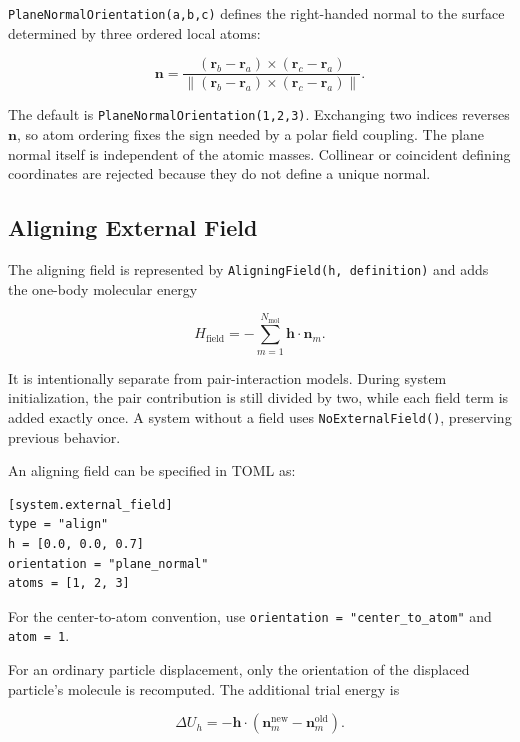 \documentclass[11pt]{article}
\begin{document}
\texttt{PlaneNormalOrientation(a,b,c)} defines the right-handed normal to the
surface determined by three ordered local atoms:

\begin{equation}
\mathbf n
=
\frac{(\mathbf r_b-\mathbf r_a)\times
      (\mathbf r_c-\mathbf r_a)}
     {\lVert(\mathbf r_b-\mathbf r_a)\times
      (\mathbf r_c-\mathbf r_a)\rVert}.
\end{equation}

The default is \texttt{PlaneNormalOrientation(1,2,3)}. Exchanging two indices
reverses \(\mathbf n\), so atom ordering fixes the sign needed by a polar field
coupling. The plane normal itself is independent of the atomic masses. Collinear
or coincident defining coordinates are rejected because they do not define a
unique normal.

\subsection{Aligning External Field}

The aligning field is represented by \texttt{AligningField(h, definition)} and
adds the one-body molecular energy

\begin{equation}
H_{\mathrm{field}}
=
-\sum_{m=1}^{N_{\mathrm{mol}}}\mathbf h\cdot\mathbf n_m.
\end{equation}

It is intentionally separate from pair-interaction models. During system
initialization, the pair contribution is still divided by two, while each field
term is added exactly once. A system without a field uses
\texttt{NoExternalField()}, preserving previous behavior.

An aligning field can be specified in TOML as:

\begin{lstlisting}
[system.external_field]
type = "align"
h = [0.0, 0.0, 0.7]
orientation = "plane_normal"
atoms = [1, 2, 3]
\end{lstlisting}

For the center-to-atom convention, use
\texttt{orientation = "center\_to\_atom"} and \texttt{atom = 1}.

For an ordinary particle displacement, only the orientation of the displaced
particle's molecule is recomputed. The additional trial energy is

\begin{equation}
\Delta U_h
=
-\mathbf h\cdot
\left(\mathbf n_m^{\mathrm{new}}-\mathbf n_m^{\mathrm{old}}\right).
\end{equation}
\end{document}
